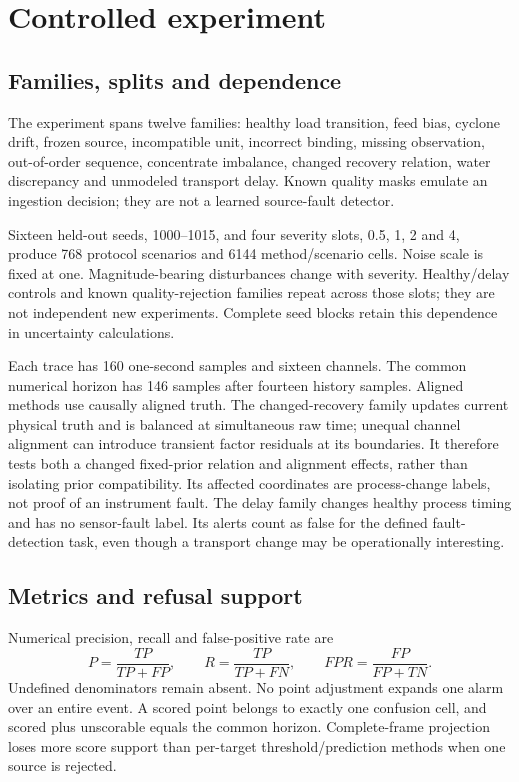 \documentclass[11pt,a4paper]{article}
\begin{document}
\section{Controlled experiment}
\subsection{Families, splits and dependence}
The experiment spans twelve families: healthy load transition, feed bias, cyclone drift, frozen source, incompatible unit, incorrect binding, missing observation, out-of-order sequence, concentrate imbalance, changed recovery relation, water discrepancy and unmodeled transport delay. Known quality masks emulate an ingestion decision; they are not a learned source-fault detector.

Sixteen held-out seeds, 1000--1015, and four severity slots, 0.5, 1, 2 and 4, produce 768 protocol scenarios and 6144 method/scenario cells. Noise scale is fixed at one. Magnitude-bearing disturbances change with severity. Healthy/delay controls and known quality-rejection families repeat across those slots; they are not independent new experiments. Complete seed blocks retain this dependence in uncertainty calculations.

Each trace has 160 one-second samples and sixteen channels. The common numerical horizon has 146 samples after fourteen history samples. Aligned methods use causally aligned truth. The changed-recovery family updates current physical truth and is balanced at simultaneous raw time; unequal channel alignment can introduce transient factor residuals at its boundaries. It therefore tests both a changed fixed-prior relation and alignment effects, rather than isolating prior compatibility. Its affected coordinates are process-change labels, not proof of an instrument fault. The delay family changes healthy process timing and has no sensor-fault label. Its alerts count as false for the defined fault-detection task, even though a transport change may be operationally interesting.

\subsection{Metrics and refusal support}
Numerical precision, recall and false-positive rate are
\begin{equation}
 P=\frac{TP}{TP+FP},\qquad R=\frac{TP}{TP+FN},\qquad
 FPR=\frac{FP}{FP+TN}.
\end{equation}
Undefined denominators remain absent. No point adjustment expands one alarm over an entire event. A scored point belongs to exactly one confusion cell, and scored plus unscorable equals the common horizon. Complete-frame projection loses more score support than per-target threshold/prediction methods when one source is rejected.
\end{document}
